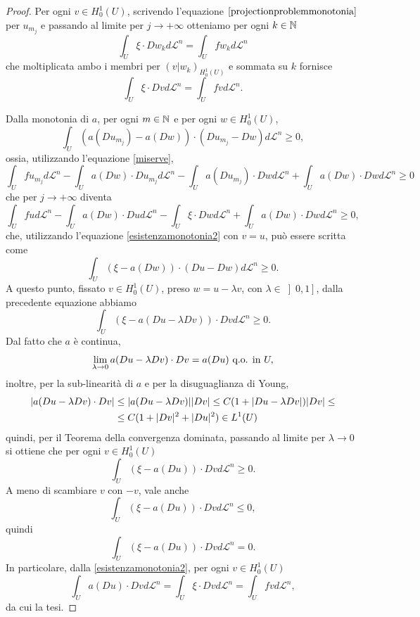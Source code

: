 \begin{proof}
	Per ogni $v \in H^1_0(U)$, scrivendo l'equazione $\eqref{projectionproblemmonotonia}$ per $u_{m_j}$ e passando al limite per $j \to +\infty$ otteniamo per ogni $k \in \mathbb{N}$
	\[ \int_U \xi \cdot Dw_k d\mathcal{L}^n = \int_U fw_k d\mathcal{L}^n \]
	che moltiplicata ambo i membri per $(v|w_k)_{H^1_0(U)}$ e sommata su $k$ fornisce
	\begin{equation}\label{esistenzamonotonia2}
		\int_U \xi \cdot Dv d\mathcal{L}^n = \int_U fvd\mathcal{L}^n.
	\end{equation}
	
	Dalla monotonia di $a$, per ogni $m \in \mathbb{N}$ e per ogni $w \in H^1_0(U)$,
	\[ \int_U \left( a(Du_{m_j})- a(Dw)\right) \cdot (Du_{m_j}-Dw) d\mathcal{L}^n \ge 0,\]
	ossia, utilizzando l'equazione \eqref{miserve},
	\[ \int_U fu_{m_j} d\mathcal{L}^n  -  \int_U a(Dw)\cdot Du_{m_j} d\mathcal{L}^n - \int_U a(Du_{m_j})\cdot Dw d\mathcal{L}^n +\int_U a(Dw)\cdot Dw d\mathcal{L}^n\ge 0\]
	che per $j \to +\infty$ diventa
	\[ \int_U fu d\mathcal{L}^n  -  \int_U a(Dw)\cdot Du d\mathcal{L}^n - \int_U \xi\cdot Dw d\mathcal{L}^n +\int_U a(Dw)\cdot Dw d\mathcal{L}^n \ge 0,\]
	che, utilizzando l'equazione \eqref{esistenzamonotonia2} con $v = u$, può essere scritta come
	\[ \int_U (\xi -a(Dw)) \cdot (Du - Dw)d\mathcal{L}^n\ge 0.\]
	A questo punto, fissato $v \in H^1_0(U)$, preso $w = u-\lambda v$, con $\lambda \in \left]0,1\right] $, dalla precedente equazione abbiamo 
	\[ \int_U (\xi -a(Du-\lambda Dv)) \cdot Dvd\mathcal{L}^n\ge 0.\]
	Dal fatto che $a$ è continua, 
	\[ \lim\limits_{\lambda \to 0}a(Du-\lambda Dv)\cdot Dv = a(Du) \textup{ q.o. in } U, \]
	inoltre, per la sub-linearità di $a$ e per la disuguaglianza di Young,
	\begin{align*}
		\lvert a(Du-\lambda Dv)\cdot Dv\rvert&\le \lvert a(Du-\lambda Dv)\rvert\lvert Dv\rvert\le C(1+\lvert Du - \lambda Dv\rvert)\lvert Dv\rvert \le \\
		&\le  C(1 + \lvert Dv\rvert^2 + \lvert Du\rvert^2) \in L^1(U)
	\end{align*}
	quindi, per il Teorema della convergenza dominata, passando al limite per $\lambda \to 0$ si ottiene che per ogni $v \in H^1_0(U)$
	\[ \int_U (\xi - a(Du))\cdot Dv d\mathcal{L}^n \ge 0. \]
	A meno di scambiare $v$ con $-v$, vale anche
	\[ \int_U (\xi - a(Du))\cdot Dv d\mathcal{L}^n \le 0, \]
	quindi 
	\[ \int_U (\xi - a(Du))\cdot Dv d\mathcal{L}^n = 0. \]
	In particolare, dalla \eqref{esistenzamonotonia2}, per ogni $v \in H^1_0(U)$
	\[ \int_U a(Du)\cdot Dv d\mathcal{L}^n = \int_U \xi \cdot Dv d\mathcal{L}^n = \int_U fv d\mathcal{L}^n, \]
	da cui la tesi.
\end{proof}
